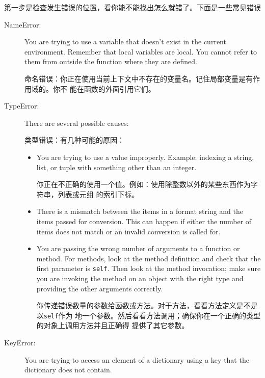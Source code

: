\documentclass[10pt]{book}
\begin{document}
\begin{CJK}{UTF8}{gbsn}
第一步是检查发生错误的位置，看你能不能找出怎么就错了。下面是一些常见错误

\begin{description}

\item[NameError:]  You are trying to use a variable that doesn't
exist in the current environment.
Remember that local variables are local.  You
cannot refer to them from outside the function where they are defined.

命名错误：你正在使用当前上下文中不存在的变量名。记住局部变量是有作用域的。你不
能在函数的外面引用它们。

\item[TypeError:] There are several possible causes:

    类型错误：有几种可能的原因：

\begin{itemize}

\item  You are trying to use a value improperly.  Example: indexing
a string, list, or tuple with something other than an integer.

你正在不正确的使用一个值。例如：使用除整数以外的某些东西作为字符串，列表或元组
的索引下标。

\item There is a mismatch between the items in a format string and
the items passed for conversion.  This can happen if either the number
of items does not match or an invalid conversion is called for.


\item You are passing the wrong number of arguments to a function or method.
For methods, look at the method definition and
check that the first parameter is {\tt self}.  Then look at the
method invocation; make sure you are invoking the method on an
object with the right type and providing the other arguments
correctly.

你传递错误数量的参数给函数或方法。对于方法，看看方法定义是不是以{\tt self}作为
地一个参数。然后看看方法调用；确保你在一个正确的类型的对象上调用方法并且正确得
提供了其它参数。

\end{itemize}

\item[KeyError:]  You are trying to access an element of a dictionary
using a key that the dictionary does not contain.


\end{description}
\end{CJK}
\end{document}
